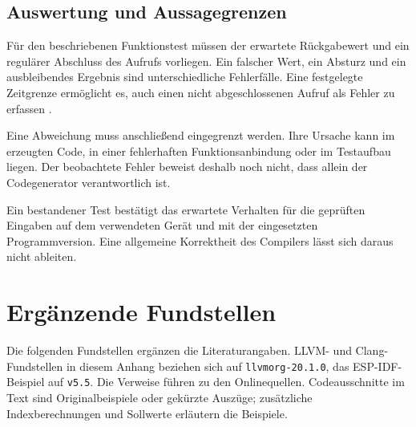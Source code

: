 \documentclass[11pt,a4paper]{article}
\newcommand{\code}[1]{\texttt{#1}}
\begin{document}
\subsection{Auswertung und Aussagegrenzen}
Für den beschriebenen Funktionstest müssen der erwartete Rückgabewert
und ein regulärer Abschluss des Aufrufs vorliegen. Ein falscher Wert,
ein Absturz und ein ausbleibendes Ergebnis sind unterschiedliche
Fehlerfälle. Eine festgelegte Zeitgrenze ermöglicht es, auch einen
nicht abgeschlossenen Aufruf als Fehler zu erfassen \parencite{csmith}.

Eine Abweichung muss anschließend eingegrenzt werden. Ihre Ursache
kann im erzeugten Code, in einer fehlerhaften Funktionsanbindung
oder im Testaufbau liegen. Der beobachtete Fehler beweist deshalb
noch nicht, dass allein der Codegenerator verantwortlich ist.

Ein bestandener Test bestätigt das erwartete Verhalten für die
geprüften Eingaben auf dem verwendeten Gerät und mit der
eingesetzten Programmversion. Eine allgemeine Korrektheit des
Compilers lässt sich daraus nicht ableiten.

\clearpage\appendix
\section{Ergänzende Fundstellen}\label{sec:quellen}
Die folgenden Fundstellen ergänzen die Literaturangaben. LLVM- und
Clang-Fundstellen in diesem Anhang beziehen sich auf \code{llvmorg-20.1.0},
das ESP-IDF-Beispiel auf \code{v5.5}. Die Verweise führen zu den Onlinequellen.
Codeausschnitte im Text sind Originalbeispiele oder gekürzte Auszüge;
zusätzliche Indexberechnungen und Sollwerte erläutern die Beispiele.
\end{document}
